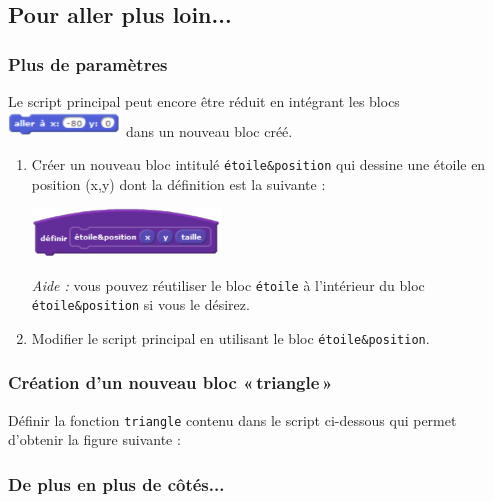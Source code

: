 \subsection{Pour aller plus loin...}

\subsubsection{Plus de paramètres}

Le script principal peut encore être réduit en intégrant les blocs \includegraphics[width=3cm]{./images/scratch03/fonction/Scratch_Fonctions_11} dans un nouveau bloc créé.

\begin{enumerate}
\item Créer un nouveau bloc intitulé \texttt{étoile\&position} qui dessine une étoile en position (x,y) dont la définition est la suivante :
\begin{center}\includegraphics[width=5cm]{./images/scratch03/fonction/Scratch_Fonctions_12}\end{center}

\emph{Aide :} vous pouvez réutiliser le bloc \texttt{étoile} à l’intérieur du bloc \texttt{étoile\&position} si vous le désirez.

\item Modifier le script principal en utilisant le bloc \texttt{étoile\&position}.
\end{enumerate}

\subsubsection{Création d'un nouveau bloc «\,triangle\,»}

Définir la fonction \texttt{triangle} contenu dans le script ci-dessous qui permet d'obtenir la figure suivante :


\subsubsection{De plus en plus de côtés...}

